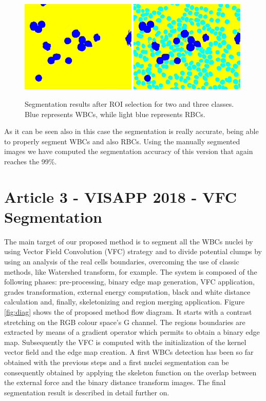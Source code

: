 \documentclass[final,a4paper,12pt,english]{UnicaPhdThesis3}
\begin{document}
	\begin{figure}[!t]
		\centering
		\includegraphics[width=0.49\textwidth]{images/2015_1_caip/ROI4}
		\includegraphics[width=0.49\textwidth]{images/2015_1_caip/ROI5}
		\caption{\label{fig:ex7}Segmentation results after ROI selection for two and three classes. Blue represents WBCs, while light blue represents RBCs.}
	\end{figure}
	
	As it can be seen also in this case the segmentation is really accurate, being able to properly segment WBCs and also RBCs. Using the manually segmented images we have computed the segmentation accuracy of this version that again reaches the 99\%. 
	
	\section{Article 3 - VISAPP 2018 - VFC Segmentation}
	The main target of our proposed method is to segment all the WBCs nuclei by using Vector Field Convolution (VFC) strategy and to divide potential clumps by using an analysis of the real cells boundaries, overcoming the use of classic methods, like Watershed transform, for example. 
	The system is composed of the following phases: pre-processing, binary edge map generation, VFC \cite{Bing} application, grades transformation, external energy computation, black and white distance calculation and, finally, skeletonizing and region merging application. Figure \ref{fig:diag} shows the of proposed method flow diagram. It starts with a contrast stretching on the RGB colour space's G channel. 
	The regions boundaries are extracted by means of a gradient operator which permits to obtain a binary edge map. Subsequently the VFC is computed with the initialization of the kernel vector field and the edge map creation. A first WBCs detection has been so far obtained with the previous steps and a first nuclei segmentation can be consequently obtained by applying the skeleton function on the overlap between the external force and the binary distance transform images. The final segmentation result is described in detail further on.
	
\end{document}
